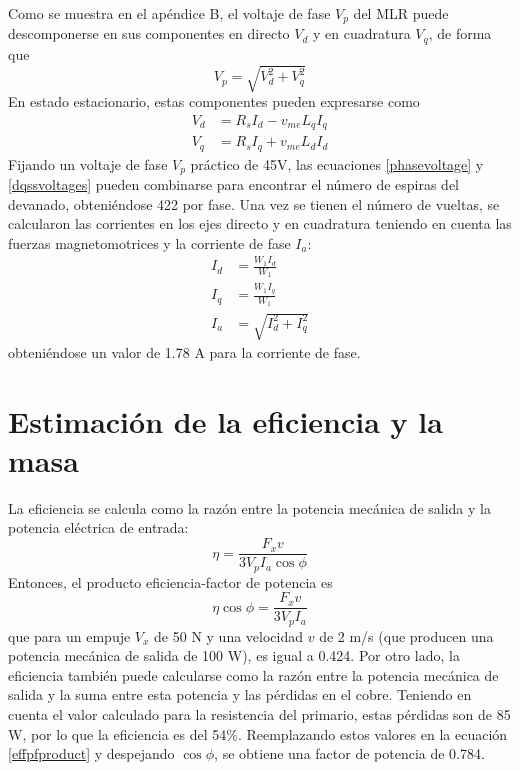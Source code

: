 Como se muestra en el apéndice B, el voltaje de fase $V_p$ del MLR puede descomponerse en sus componentes en directo $V_d$ y en cuadratura $V_q$, de forma que
\begin{equation*}
V_p = \sqrt{V_d^2 + V_q^2}
\label{phasevoltage}
\end{equation*}
En estado estacionario, estas componentes pueden expresarse como
\begin{align}
V_d &= R_s I_d - v_{me}L_q I_q\\
V_q &= R_s I_q + v_{me}L_d I_d
\label{dqssvoltages}
\end{align}
Fijando un voltaje de fase $V_p$ práctico de 45V, las ecuaciones \ref{phasevoltage} y \ref{dqssvoltages} pueden combinarse para encontrar el número de espiras del devanado, obteniéndose 422 por fase.
Una vez se tienen el número de vueltas, se calcularon las corrientes en los ejes directo y en cuadratura teniendo en cuenta las fuerzas magnetomotrices y la corriente de fase $I_a$:
\begin{align*}
I_d &= \frac{W_1 I_d}{W_1}\\
I_q &= \frac{W_1 I_q}{W_1}\\
I_a &= \sqrt{I_d^2 + I_q^2}
\end{align*}
obteniéndose un valor de 1.78 A para la corriente de fase.

\section{Estimación de la eficiencia y la masa}
La eficiencia se calcula como la razón entre la potencia mecánica de salida y la potencia eléctrica de entrada:
\begin{equation*}
\eta = \frac{F_x v}{3V_p I_a\cos\phi}
\end{equation*}
Entonces, el producto eficiencia-factor de potencia es
\begin{equation}
\eta\cos\phi = \frac{F_x v}{3V_p I_a}
\label{effpfproduct}
\end{equation}
que para un empuje $V_x$ de 50 N y una velocidad $v$ de 2 m/s (que producen una potencia mecánica de salida de 100 W), es igual a 0.424.
Por otro lado, la eficiencia también puede calcularse como la razón entre la potencia mecánica de salida y la suma entre esta potencia y las pérdidas en el cobre. Teniendo en cuenta el valor calculado para la resistencia del primario, estas pérdidas son de 85 W, por lo que la eficiencia es del 54\%. Reemplazando estos valores en la ecuación \ref{effpfproduct} y despejando $\cos\phi$, se obtiene una factor de potencia de 0.784.

